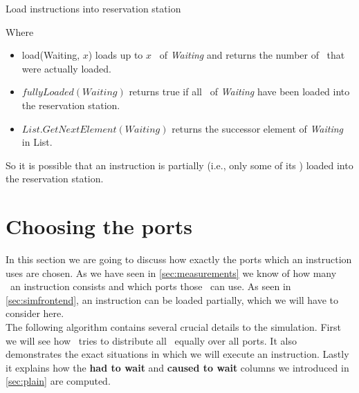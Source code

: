 \begin{algorithm}[H]
    \SetAlgoLined
    \caption{Load instructions into reservation station}
\end{algorithm}
\vspace{5pt}
Where
\begin{itemize}
    \item load\microops(Waiting, $x$) loads up to $x$ \microops\ of \emph{Waiting} and returns the number of \microops\ that were actually loaded.
    \item $fullyLoaded(Waiting)$ returns true if all \microops\ of \emph{Waiting} have been loaded into the reservation station.
    \item $List.GetNextElement(Waiting)$ returns the successor element of \emph{Waiting} in List.
\end{itemize}

So it is possible that an instruction is partially (i.e., only some of its \microops) loaded into the reservation station.

\section{Choosing the ports}
\label{sec:chooseport}

In this section we are going to discuss how exactly the ports which an instruction uses are chosen. As we have seen in \autoref{sec:measurements} we know of how many \microops\ an instruction consists and which ports those \microops\ can use. As seen in \autoref{sec:simfrontend}, an instruction can be loaded partially, which we will have to consider here.\\
The following algorithm contains several crucial details to the simulation. First we will see how \suaca\ tries to distribute all \microops\ equally over all ports. It also demonstrates the exact situations in which we will execute an instruction. Lastly it explains how the \textbf{had to wait} and \textbf{caused to wait} columns we introduced in \autoref{sec:plain} are computed. 
\newpage

